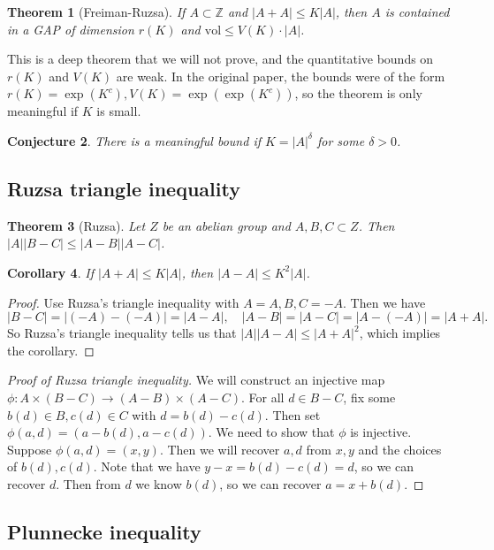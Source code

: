 \documentclass[12pt]{amsart}
\newtheorem{theorem}{Theorem}[section]
\newtheorem{conj}[theorem]{Conjecture}
\newtheorem{corollary}[theorem]{Corollary}
\newcommand{\Z}{\mathbb{Z}}
\newcommand{\vol}{\mathrm{vol}}
\begin{document}
\begin{theorem}[Freiman-Ruzsa]
    If $A\subset\Z$ and $|A+A|\leq K|A|$, then $A$ is contained in a GAP of dimension $r(K)$ and $\vol\leq V(K)\cdot|A|$.
\end{theorem}

This is a deep theorem that we will not prove, and the quantitative bounds on $r(K)$ and $V(K)$ are weak. In the original paper, the bounds were of the form $r(K)=\exp(K^c),V(K)=\exp(\exp(K^c))$, so the theorem is only meaningful if $K$ is small.

\begin{conj}
    There is a meaningful bound if $K=|A|^\delta$ for some $\delta>0$.
\end{conj}

\subsection{Ruzsa triangle inequality}

\begin{theorem}[Ruzsa]
    Let $Z$ be an abelian group and $A,B,C\subset Z$. Then $|A||B-C|\leq|A-B||A-C|$.
\end{theorem}

\begin{corollary}
    If $|A+A|\leq K|A|$, then $|A-A|\leq K^2|A|$.
\end{corollary}
\begin{proof}
    Use Ruzsa's triangle inequality with $A=A,B,C=-A$. Then we have
    $$|B-C|=|(-A)-(-A)|=|A-A|,\quad|A-B|=|A-C|=|A-(-A)|=|A+A|.$$
    So Ruzsa's triangle inequality tells us that $|A||A-A|\leq|A+A|^2$, which implies the corollary.
\end{proof}

\begin{proof}[Proof of Ruzsa triangle inequality]
    We will construct an injective map $\phi:A\times (B-C)\to(A-B)\times(A-C)$. For all $d\in B-C$, fix some $b(d)\in B,c(d)\in C$ with $d=b(d)-c(d)$. Then set $\phi(a,d)=(a-b(d),a-c(d))$. We need to show that $\phi$ is injective. Suppose $\phi(a,d)=(x,y)$. Then we will recover $a,d$ from $x,y$ and the choices of $b(d),c(d)$. Note that we have $y-x=b(d)-c(d)=d$, so we can recover $d$. Then from $d$ we know $b(d)$, so we can recover $a=x+b(d)$.
\end{proof}

\subsection{Plunnecke inequality}
\end{document}
